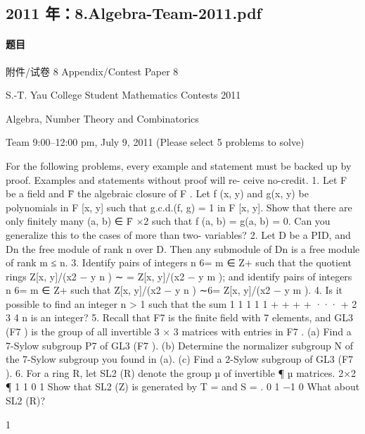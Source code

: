 \documentclass[UTF8,12pt]{ctexart}
\begin{document}
\subsection{2011 年：8.Algebra-Team-2011.pdf}
\paragraph{题目}
附件/试卷 8 Appendix/Contest Paper 8

S.-T. Yau College Student Mathematics Contests 2011

Algebra, Number Theory and Combinatorics

Team 9:00–12:00 pm, July 9, 2011 (Please select 5 problems to solve)

For the following problems, every example and statement must be backed up by proof. Examples and statements without proof will re- ceive no-credit. 1. Let F be a field and F̄ the algebraic closure of F . Let f (x, y) and g(x, y) be polynomials in F [x, y] such that g.c.d.(f, g) = 1 in F [x, y]. Show that there are only finitely many (a, b) ∈ F̄ ×2 such that f (a, b) = g(a, b) = 0. Can you generalize this to the cases of more than two- variables? 2. Let D be a PID, and Dn the free module of rank n over D. Then any submodule of Dn is a free module of rank m ≤ n. 3. Identify pairs of integers n 6= m ∈ Z+ such that the quotient rings Z[x, y]/(x2 − y n ) ∼ = Z[x, y]/(x2 − y m ); and identify pairs of integers n 6= m ∈ Z+ such that Z[x, y]/(x2 − y n ) ∼6= Z[x, y]/(x2 − y m ). 4. Is it possible to find an integer n > 1 such that the sum 1 1 1 1 1 + + + + ··· + 2 3 4 n is an integer? 5. Recall that F7 is the finite field with 7 elements, and GL3 (F7 ) is the group of all invertible 3 × 3 matrices with entries in F7 . (a) Find a 7-Sylow subgroup P7 of GL3 (F7 ). (b) Determine the normalizer subgroup N of the 7-Sylow subgroup you found in (a). (c) Find a 2-Sylow subgroup of GL3 (F7 ). 6. For a ring R, let SL2 (R) denote the group µ of invertible ¶ µ matrices. 2×2 ¶ 1 1 0 1 Show that SL2 (Z) is generated by T = and S = . 0 1 −1 0 What about SL2 (R)?

1
\end{document}
